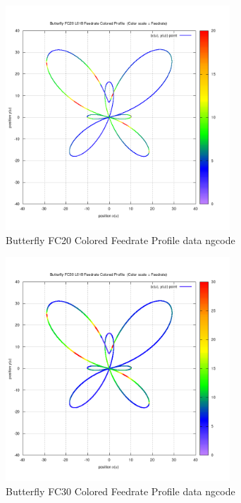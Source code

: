 \begin{figure}
	\caption     {Butterfly FC20 Colored Feedrate Profile data ngcode}
	\label{18-img-Butterfly-FC20-Colored-Feedrate-Profile-data_ngcode.png}
	\includegraphics[width=0.75\textwidth]{Chap4/appendix/app-Butterfly/plots/18-img-Butterfly-FC20-Colored-Feedrate-Profile-data_ngcode.png}
\end{figure}

\clearpage
\pagebreak

\begin{figure}
	\caption     {Butterfly FC30 Colored Feedrate Profile data ngcode}
	\label{19-img-Butterfly-FC30-Colored-Feedrate-Profile-data_ngcode.png}
	\includegraphics[width=0.75\textwidth]{Chap4/appendix/app-Butterfly/plots/19-img-Butterfly-FC30-Colored-Feedrate-Profile-data_ngcode.png}
\end{figure}


